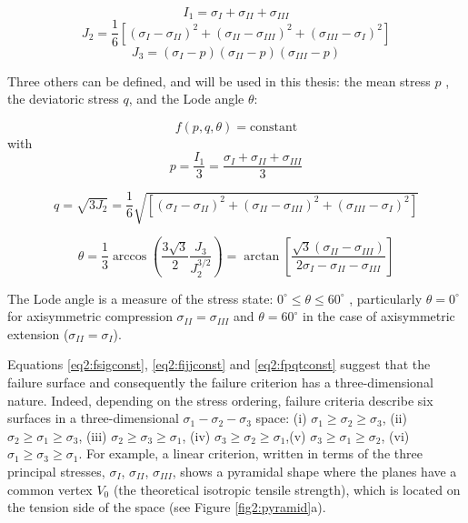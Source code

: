 \begin{equation}
   I_1 = \sigma_{I} + \sigma_{II} + \sigma_{III}
\end{equation}
\begin{equation}
    J_{2} = \frac{1}{6}\left[\left(\sigma_{I}-\sigma_{I I}\right)^{2}+\left(\sigma_{I I}-\sigma_{I I I}\right)^{2}+\left(\sigma_{I I I}-\sigma_{I}\right)^{2}\right]
\end{equation}
\begin{equation}
    J_{3} = \left(\sigma_{I}-p\right)\left(\sigma_{I I}-p\right)\left(\sigma_{III}-p\right)
\end{equation}

Three others can be defined, and will be used in this thesis: the mean stress $p$ , the deviatoric stress $q$, and the Lode angle $\theta$:

\begin{equation} \label{eq2:fpqtconst}
    f(p,q,\theta) = \text{constant}
\end{equation}
with
\begin{equation} \label{eq2:peq}
    p=\frac{I_{1}}{3}=\frac{\sigma_{I}+\sigma_{II}+\sigma_{III}}{3}
\end{equation}

\begin{equation}\label{eq2:qeq}
    q=\sqrt{3 J_{2}}=\frac{1}{6} \sqrt{\left[\left(\sigma_{I}-\sigma_{II}\right)^{2}+\left(\sigma_{II}-\sigma_{III}\right)^{2}+\left(\sigma_{III}-\sigma_{I}\right)^{2}\right]}
\end{equation}

\begin{equation}\label{eq2:theta}
    \theta=\frac{1}{3} \arccos \left(\frac{3 \sqrt{3}}{2} \frac{J_{3}}{J_{2}^{3 / 2}}\right)=\arctan \left[\frac{\sqrt{3}\left(\sigma_{II}-\sigma_{III}\right)}{2 \sigma_{I}-\sigma_{II}-\sigma_{III}}\right]
\end{equation}

The Lode angle is a measure of the stress state: $0^{\circ} \leq \theta \leq 60^{\circ}$ , particularly $\theta = 0^{\circ}$  for axisymmetric compression $\sigma_{II} = \sigma_{III} $ and $\theta = 60^{\circ}$ in the case of axisymmetric extension ($\sigma_{II} = \sigma_{I} $). 

Equations \ref{eq2:fsigconst}, \ref{eq2:fijjconst} and \ref{eq2:fpqtconst} suggest that the failure surface and consequently the failure criterion has a three-dimensional nature. Indeed, depending on the stress ordering, failure criteria describe six surfaces in a three-dimensional  $\sigma_1 -\sigma_2 -\sigma_3$  space: (i) $\sigma_1 \geq \sigma_2 \geq \sigma_3$, (ii) $\sigma_2 \geq \sigma_1 \geq \sigma_3$, (iii) $\sigma_2 \geq \sigma_3 \geq \sigma_1$, (iv) $\sigma_3 \geq \sigma_2 \geq \sigma_1$,(v) $\sigma_3 \geq \sigma_1 \geq \sigma_2$, (vi) $\sigma_1 \geq \sigma_3 \geq \sigma_1$. For example, a linear criterion, written in terms of the three principal stresses, $\sigma_I$, $\sigma_{II}$, $\sigma_{III}$, shows a pyramidal shape where the planes have a common vertex $V_0$ (the theoretical isotropic tensile strength), which is located on the tension side of the space (see Figure \ref{fig2:pyramid}a).  

